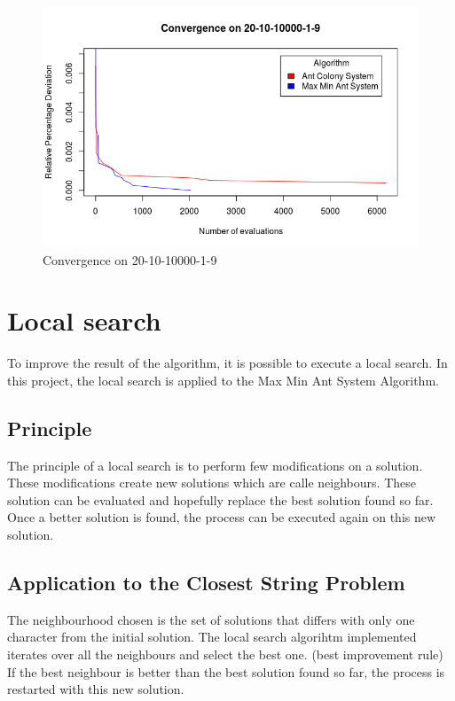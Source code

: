 \documentclass{article}
\begin{document}
\begin{figure}
    \centering
        \includegraphics[scale=0.5]{conv-20-10}
    \caption{Convergence on 20-10-10000-1-9}
    \label{fig:conv2}
\end{figure}

\section{Local search}

To improve the result of the algorithm, it is possible to execute a local search.
In this project, the local search is applied to the Max Min Ant System Algorithm.

\subsection{Principle}

The principle of a local search is to perform few modifications on a solution.
These modifications create new solutions which are calle neighbours.
These solution can be evaluated and hopefully replace the best solution found so far.
Once a better solution is found, the process can be executed again on this new solution.

\subsection{Application to the Closest String Problem}

The neighbourhood chosen is the set of solutions that differs with only one character from the initial solution.
The local search algorihtm implemented iterates over all the neighbours and select the best one. (best improvement rule)
If the best neighbour is better than the best solution found so far, the process is restarted with this new solution. \newline
\end{document}
